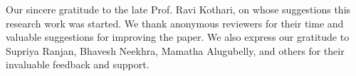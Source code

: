 \documentclass[runningheads]{llncs}
\begin{document}
\begin{credits}
\subsubsection{\ackname}Our sincere gratitude to the late Prof. Ravi Kothari, on whose suggestions this research work was started. We thank anonymous reviewers for their time and valuable suggestions for improving the paper. We also express our gratitude to  Supriya Ranjan, Bhavesh Neekhra, Mamatha Alugubelly, and others for their invaluable feedback and support.  

\end{credits}
%
%
%


%




\end{document}
